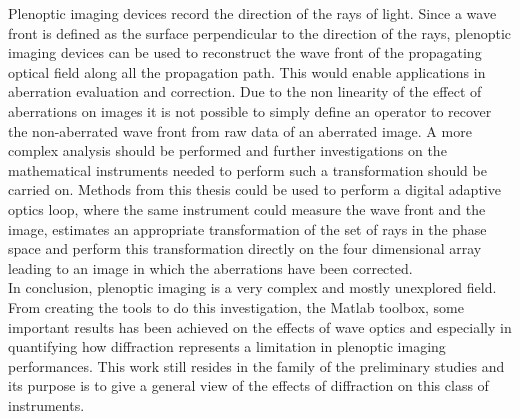 Plenoptic imaging devices record the direction of the rays of light. Since a wave front is defined as the surface perpendicular to the direction of the rays, plenoptic imaging devices can be used to reconstruct the wave front of the propagating optical field along all the propagation path. This would enable applications in aberration evaluation and correction. Due to the non linearity of the effect of aberrations on images it is not possible to simply define an operator to recover the non-aberrated wave front from raw data of an aberrated image. A more complex analysis should be performed and further investigations on the mathematical instruments needed to perform such a transformation should be carried on. Methods from this thesis could be used to perform a digital adaptive optics loop, where the same instrument could measure the wave front and the image, estimates an appropriate transformation of the set of rays in the phase space and perform this transformation directly on the four dimensional array leading to an image in which the aberrations have been corrected. \\
In conclusion, plenoptic imaging is a very complex and mostly unexplored field. From creating the tools to do this investigation, the Matlab toolbox, some important results has been achieved on the effects of wave optics and especially in quantifying how diffraction represents a limitation in plenoptic imaging performances. This work still resides in the family of the preliminary studies and its purpose is to give a general view of the effects of diffraction on this class of instruments.\\ 
